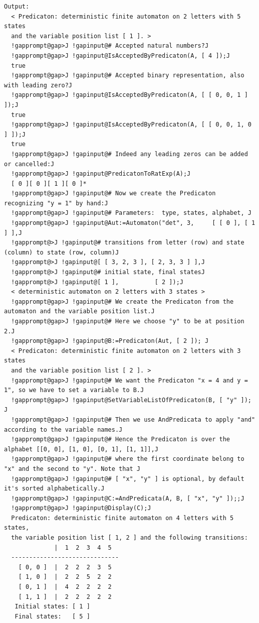 \documentclass[a4paper,11pt]{report}
\begin{document}
{{{\begin{Verbatim}[commandchars=!@J,fontsize=\small,frame=single,label=Example]
   Output:
  < Predicaton: deterministic finite automaton on 2 letters with 5 states 
  and the variable position list [ 1 ]. >
  !gapprompt@gap>J !gapinput@# Accepted natural numbers?J
  !gapprompt@gap>J !gapinput@IsAcceptedByPredicaton(A, [ 4 ]);J
  true
  !gapprompt@gap>J !gapinput@# Accepted binary representation, also with leading zero?J
  !gapprompt@gap>J !gapinput@IsAcceptedByPredicaton(A, [ [ 0, 0, 1 ] ]);J
  true
  !gapprompt@gap>J !gapinput@IsAcceptedByPredicaton(A, [ [ 0, 0, 1, 0 ] ]);J
  true
  !gapprompt@gap>J !gapinput@# Indeed any leading zeros can be added or cancelled:J
  !gapprompt@gap>J !gapinput@PredicatonToRatExp(A);J
  [ 0 ][ 0 ][ 1 ][ 0 ]*
  !gapprompt@gap>J !gapinput@# Now we create the Predicaton recognizing "y = 1" by hand:J
  !gapprompt@gap>J !gapinput@# Parameters:  type, states, alphabet, J
  !gapprompt@gap>J !gapinput@Aut:=Automaton("det", 3,     [ [ 0 ], [ 1 ] ],J
  !gapprompt@>J !gapinput@# transitions from letter (row) and state (column) to state (row, column)J
  !gapprompt@>J !gapinput@[ [ 3, 2, 3 ], [ 2, 3, 3 ] ],J
  !gapprompt@>J !gapinput@# initial state, final statesJ
  !gapprompt@>J !gapinput@[ 1 ],          [ 2 ]);J
  < deterministic automaton on 2 letters with 3 states >
  !gapprompt@gap>J !gapinput@# We create the Predicaton from the automaton and the variable position list.J
  !gapprompt@gap>J !gapinput@# Here we choose "y" to be at position 2.J
  !gapprompt@gap>J !gapinput@B:=Predicaton(Aut, [ 2 ]); J
  < Predicaton: deterministic finite automaton on 2 letters with 3 states 
  and the variable position list [ 2 ]. >
  !gapprompt@gap>J !gapinput@# We want the Predicaton "x = 4 and y = 1", so we have to set a variable to B.J
  !gapprompt@gap>J !gapinput@SetVariableListOfPredicaton(B, [ "y" ]); J
  !gapprompt@gap>J !gapinput@# Then we use AndPredicata to apply "and" according to the variable names.J
  !gapprompt@gap>J !gapinput@# Hence the Predicaton is over the alphabet [[0, 0], [1, 0], [0, 1], [1, 1]],J
  !gapprompt@gap>J !gapinput@# where the first coordinate belong to "x" and the second to "y". Note that J
  !gapprompt@gap>J !gapinput@# [ "x", "y" ] is optional, by default it's sorted alphabetically.J
  !gapprompt@gap>J !gapinput@C:=AndPredicata(A, B, [ "x", "y" ]);;J
  !gapprompt@gap>J !gapinput@Display(C);J
  Predicaton: deterministic finite automaton on 4 letters with 5 states, 
  the variable position list [ 1, 2 ] and the following transitions:
              |  1  2  3  4  5  
  ------------------------------
    [ 0, 0 ]  |  2  2  2  3  5  
    [ 1, 0 ]  |  2  2  5  2  2  
    [ 0, 1 ]  |  4  2  2  2  2  
    [ 1, 1 ]  |  2  2  2  2  2  
   Initial states: [ 1 ]
   Final states:   [ 5 ]
  

\end{Verbatim}}}}
\end{document}

